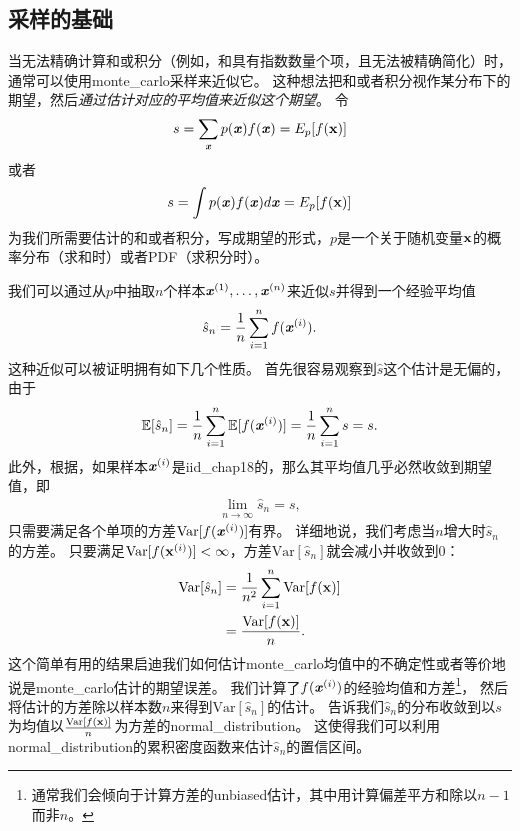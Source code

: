 \subsection{采样的基础}
\label{sec:basics_of_monte_carlo_sampling}

当无法精确计算和或积分（例如，和具有指数数量个项，且无法被精确简化）时，通常可以使用\gls{monte_carlo}采样来近似它。
这种想法把和或者积分视作某分布下的期望，然后\emph{通过估计对应的平均值来近似这个期望}。
令
\begin{align}
s = \sum_{\boldsymbol{\mathit{x}}} p(\boldsymbol{\mathit{x}})f(\boldsymbol{\mathit{x}}) = E_p[f(\mathbf{x})]
\end{align}
或者
\begin{align}
\label{eqn:integra}
s = \int p(\boldsymbol{\mathit{x}})f(\boldsymbol{\mathit{x}})d\boldsymbol{\mathit{x}} = E_p[f(\mathbf{x})]
\end{align}
为我们所需要估计的和或者积分，写成期望的形式，$p$是一个关于随机变量$\mathbf{x}$的概率分布（求和时）或者\gls{PDF}（求积分时）。

我们可以通过从$p$中抽取$n$个样本$\boldsymbol{\mathit{x}}^{(1)},\ldots,\boldsymbol{\mathit{x}}^{(n)}$来近似$s$并得到一个经验平均值   
\begin{align}	
\hat{s}_n = \frac{1}{n}\sum_{i=1}^{n}f(\boldsymbol{\mathit{x}}^{(i)}).
\end{align}
这种近似可以被证明拥有如下几个性质。
首先很容易观察到$\hat{s}$这个估计是无偏的，由于
\begin{align}
\mathbb{E}[\hat{s}_n] = \frac{1}{n}\sum_{i=1}^{n}\mathbb{E}[f(\boldsymbol{\mathit{x}}^{(i)})] = \frac{1}{n}\sum_{i=1}^{n}s = s.
\end{align}
此外，根据，如果样本$\boldsymbol{\mathit{x}}^{(i)}$是\gls{iid_chap18}的，那么其平均值几乎必然收敛到期望值，即
\begin{align}
\lim_{n\xrightarrow{}\infty} \hat{s}_n = s,
\end{align}
只需要满足各个单项的方差$\text{Var}[f(\boldsymbol{\mathit{x}}^{(i)})]$有界。 
详细地说，我们考虑当$n$增大时$\hat{s}_n$的方差。
只要满足$\text{Var}[f(\mathbf{x}^{(i)})]<\infty$，方差$\text{Var}[\hat{s}_n]$就会减小并收敛到$0$：
\begin{align}
\text{Var}[\hat{s}_n] & = \frac{1}{n^2}\sum_{i=1}^{n}\text{Var}[f(\mathbf{x})]\\
&  = \frac{\text{Var}[f(\mathbf{x})]}{n}.
\end{align}
这个简单有用的结果启迪我们如何估计\gls{monte_carlo}均值中的不确定性或者等价地说是\gls{monte_carlo}估计的期望误差。 %
我们计算了$f(\boldsymbol{\mathit{x}}^{(i)})$的经验均值和方差\footnote{通常我们会倾向于计算方差的\gls{unbiased}估计，其中用计算偏差平方和除以$n-1$而非$n$。}， 
然后将估计的方差除以样本数$n$来得到$\text{Var}[\hat{s}_n]$的估计。
告诉我们$\hat{s}_n$的分布收敛到以$s$为均值以$\frac{\text{Var}[f(\mathbf{x})]}{n}$为方差的\gls{normal_distribution}。
这使得我们可以利用\gls{normal_distribution}的累积密度函数来估计$\hat{s}_n$的置信区间。


